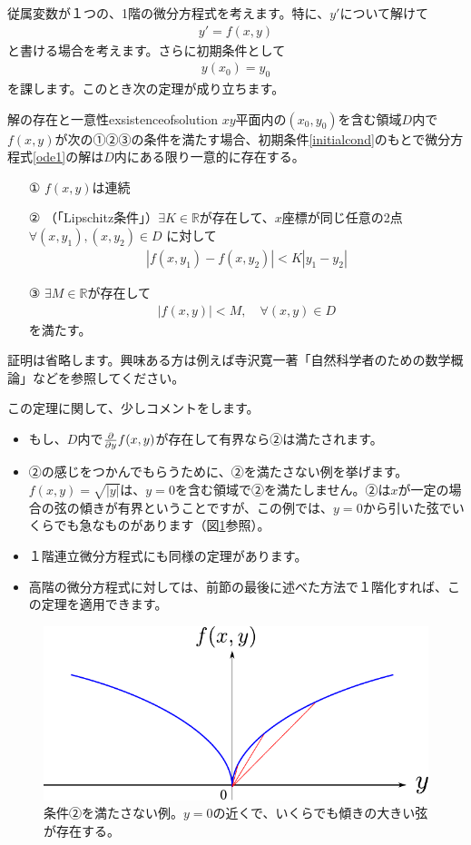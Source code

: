 \documentclass[report,paper=a4, fontsize=12pt, line_length=16cm, number_of_lines=33,dvipdfmx]{jlreq}
\numberwithin{equation}{section}
\newcommand{\Rb}{\mathbb{R}}
\begin{document}
従属変数が１つの、1階の微分方程式を考えます。特に、$y'$について解けて
\begin{align}
  y'=f(x,y)\label{ode1}
\end{align}
と書ける場合を考えます。さらに初期条件として
\begin{align}
  y(x_0)=y_0\label{initialcond}
\end{align}
を課します。このとき次の定理が成り立ちます。
\begin{theor}{解の存在と一意性}{exsistenceofsolution}
  $xy$平面内の$(x_0,y_0)$を含む領域$D$内で$f(x,y)$が次の①②③の条件を満たす場合、初期条件\eqref{initialcond}のもとで微分方程式\eqref{ode1}の解は$D$内にある限り一意的に存在する。
  \begin{itemize}
    \item[①] $f(x,y)$は連続
    \item[②] （「Lipschitz条件」）$\exists K\in \Rb$が存在して、$x$座標が同じ任意の2点$\forall (x,y_1),(x,y_2)\in D$ に対して
    \begin{align}
      |f(x,y_1)-f(x,y_2)|< K|y_1-y_2|
    \end{align}
    \item[③] $\exists M \in \Rb$が存在して
    \begin{align}
      |f(x,y)|<M,\quad \forall (x,y)\in D
    \end{align}
    を満たす。
  \end{itemize}
\end{theor}
証明は省略します。興味ある方は例えば寺沢寛一著「自然科学者のための数学概論」などを参照してください。

この定理に関して、少しコメントをします。
\begin{itemize}
  \item もし、$D$内で$\pdv{y}f(x,y)$が存在して有界なら②は満たされます。
  \item ②の感じをつかんでもらうために、②を満たさない例を挙げます。$f(x,y)=\sqrt{|y|}$は、$y=0$を含む領域で②を満たしません。②は$x$が一定の場合の弦の傾きが有界ということですが、この例では、$y=0$から引いた弦でいくらでも急なものがあります（図\ref{fig:singular}参照）。
  \item １階連立微分方程式にも同様の定理があります。
  \item 高階の微分方程式に対しては、前節の最後に述べた方法で１階化すれば、この定理を適用できます。
\end{itemize}
\begin{figure}[htbp]
  \centering
  \includegraphics{singular.pdf}
  \caption{条件②を満たさない例。$y=0$の近くで、いくらでも傾きの大きい弦が存在する。}
  \label{fig:singular}
\end{figure}
\end{document}
